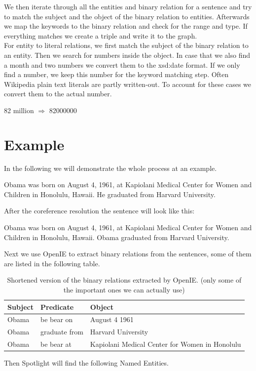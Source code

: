 \documentclass[runningheads]{llncs}
\begin{document}
We then iterate through all the entities and binary relation for a sentence and try to match the subject and the object of the binary relation to entities. Afterwards we map the keywords to the binary relation and check for the range and type. If everything matches we create a triple and write it to the graph. \\

For entity to literal relations, we first match the subject of the binary relation to an entity. Then we search for numbers inside the object. In case that we also find a month and two numbers we convert them to the xsd:date format. If we only find a number, we keep this number for the keyword matching step. Often Wikipedia plain text literals are partly written-out. To account for these cases we convert them to the actual number. 
\begin{example} 82 million $\Rightarrow$ 82000000 \end{example}
   
\section{Example}
In the following we will demonstrate the whole process at an example.

\begin{example}
Obama was born on August 4, 1961, at Kapiolani Medical Center for
Women and Children in Honolulu, Hawaii. He graduated from Harvard
University.\end{example}

After the coreference resolution the sentence will look like this: 

\begin{example}
	Obama was born on August 4, 1961, at Kapiolani Medical Center for
	Women and Children in Honolulu, Hawaii. Obama graduated from Harvard
	University.\end{example}

Next we use OpenIE to extract binary relations from the sentences, some of them are listed in the following table.


\begin{table}
		\caption{Shortened version of the binary relations extracted by OpenIE. (only some of the important ones we can actually use)}\label{tab1}
	\begin{center}
		\begin{tabularx}{\textwidth}{@{}|l|l|Y|@{}}
			\hline
			\textbf{Subject} &  \textbf{Predicate} & \textbf{Object}\\
			\hline
			Obama &  be bear on & August 4 1961\\
			Obama &  graduate from & Harvard University\\
			Obama &  be bear at & Kapiolani Medical Center for Women in Honolulu\\
			\hline
		\end{tabularx}
	\end{center}
\end{table}
\pagebreak
Then Spotlight will find the following Named Entities.
\end{document}
